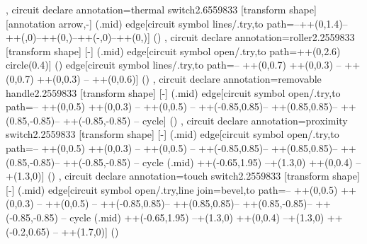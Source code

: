 {{  },
  circuit declare annotation={thermal switch}{2.6559833\tikzcircuitssizeunit}
  {
    [transform shape]
    [annotation arrow,-]
    (\tikzlastnode.mid) edge[circuit symbol lines/.try,to path={--++(0,1.4\tikzcircuitssizeunit)--++(\tikzcircuitssizeunit,0)--++(0,\tikzcircuitssizeunit)--++(-\tikzcircuitssizeunit,0)--++(0,\tikzcircuitssizeunit)}] ()
  },
  circuit declare annotation={roller}{2.2559833\tikzcircuitssizeunit}
  {
    [transform shape]
    [-]
    (\tikzlastnode.mid) edge[circuit symbol open/.try,to path={++(0,2.6\tikzcircuitssizeunit) circle(0.4\tikzcircuitssizeunit)}] () edge[circuit symbol lines/.try,to path={-- ++(0,0.7\tikzcircuitssizeunit) ++(0,0.3\tikzcircuitssizeunit) -- ++(0,0.7\tikzcircuitssizeunit) ++(0,0.3\tikzcircuitssizeunit) -- ++(0,0.6\tikzcircuitssizeunit)}] () 
  },
  circuit declare annotation={removable handle}{2.2559833\tikzcircuitssizeunit}
  {
    [transform shape]
    [-]
    (\tikzlastnode.mid) edge[circuit symbol open/.try,to path={-- ++(0,0.5\tikzcircuitssizeunit) ++(0,0.3\tikzcircuitssizeunit) -- ++(0,0.5\tikzcircuitssizeunit) -- ++(-0.85\tikzcircuitssizeunit,0.85\tikzcircuitssizeunit)-- ++(0.85\tikzcircuitssizeunit,0.85\tikzcircuitssizeunit)-- ++(0.85\tikzcircuitssizeunit,-0.85\tikzcircuitssizeunit)-- ++(-0.85\tikzcircuitssizeunit,-0.85\tikzcircuitssizeunit) -- cycle}] ()
  },
  circuit declare annotation={proximity switch}{2.2559833\tikzcircuitssizeunit}
  {
    [transform shape]
    [-]
    (\tikzlastnode.mid) edge[circuit symbol open/.try,to path={-- ++(0,0.5\tikzcircuitssizeunit) ++(0,0.3\tikzcircuitssizeunit) -- ++(0,0.5\tikzcircuitssizeunit) -- ++(-0.85\tikzcircuitssizeunit,0.85\tikzcircuitssizeunit)-- ++(0.85\tikzcircuitssizeunit,0.85\tikzcircuitssizeunit)-- ++(0.85\tikzcircuitssizeunit,-0.85\tikzcircuitssizeunit)-- ++(-0.85\tikzcircuitssizeunit,-0.85\tikzcircuitssizeunit) -- cycle (\tikzlastnode.mid) ++(-0.65\tikzcircuitssizeunit,1.95\tikzcircuitssizeunit) --+(1.3\tikzcircuitssizeunit,0) ++(0,0.4\tikzcircuitssizeunit) --+(1.3\tikzcircuitssizeunit,0)}] ()
  },
  circuit declare annotation={touch switch}{2.2559833\tikzcircuitssizeunit}
  {
    [transform shape]
    [-]
    (\tikzlastnode.mid) edge[circuit symbol open/.try,line join=bevel,to path={-- ++(0,0.5\tikzcircuitssizeunit) ++(0,0.3\tikzcircuitssizeunit) -- ++(0,0.5\tikzcircuitssizeunit) -- ++(-0.85\tikzcircuitssizeunit,0.85\tikzcircuitssizeunit)-- ++(0.85\tikzcircuitssizeunit,0.85\tikzcircuitssizeunit)-- ++(0.85\tikzcircuitssizeunit,-0.85\tikzcircuitssizeunit)-- ++(-0.85\tikzcircuitssizeunit,-0.85\tikzcircuitssizeunit) -- cycle (\tikzlastnode.mid) ++(-0.65\tikzcircuitssizeunit,1.95\tikzcircuitssizeunit) --+(1.3\tikzcircuitssizeunit,0) ++(0,0.4\tikzcircuitssizeunit) --+(1.3\tikzcircuitssizeunit,0) ++(-0.2\tikzcircuitssizeunit,0.65\tikzcircuitssizeunit) -- ++(1.7\tikzcircuitssizeunit,0)}] ()
}}
